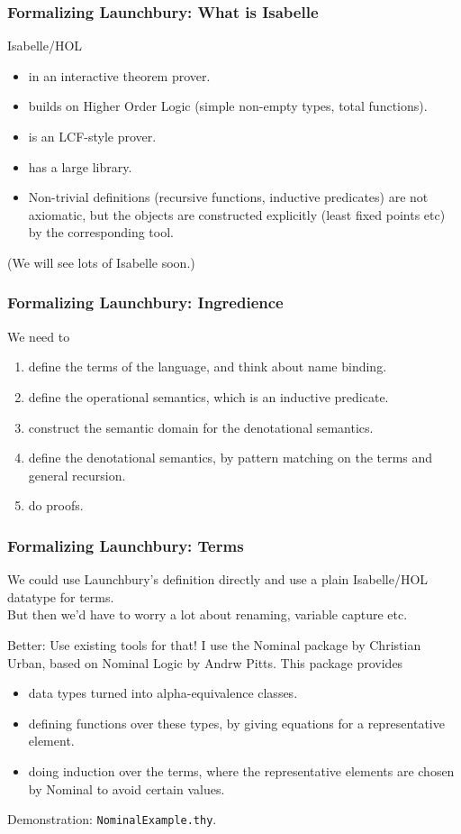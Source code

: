 \documentclass{beamer}
\begin{document}
\begin{frame}
\frametitle{Formalizing Launchbury: What is Isabelle}

Isabelle/HOL
\begin{itemize}
\item in an interactive theorem prover.
\item builds on Higher Order Logic (simple non-empty types, total functions).
\item is an LCF-style prover.
\item has a large library.
\item Non-trivial definitions (recursive functions, inductive predicates) are not axiomatic, but the objects are constructed explicitly (least fixed points etc) by the corresponding tool.
\end{itemize}

(We will see lots of Isabelle soon.)

\end{frame}

\begin{frame}
\frametitle{Formalizing Launchbury: Ingredience}
We need to
\begin{enumerate}
\item define the terms of the language, and think about name binding.
\item define the operational semantics, which is an inductive predicate.
\item construct the semantic domain for the denotational semantics.
\item define the denotational semantics, by pattern matching on the terms and general recursion.
\item do proofs.
\end{enumerate}

\end{frame}

\begin{frame}
\frametitle{Formalizing Launchbury: Terms}

We could use Launchbury's definition directly and use a plain Isabelle/HOL datatype for terms.\\
But then we’d have to worry a lot about renaming, variable capture etc.

\pause
\bigskip

Better: Use existing tools for that! I use the Nominal package by Christian Urban, based on Nominal Logic by Andrw Pitts. This package provides 

\begin{itemize}
\item data types turned into alpha-equivalence classes.
\item defining functions over these types, by giving equations for a representative element.
\item doing induction over the terms, where the representative elements are chosen by Nominal to avoid certain values.
\end{itemize}

\begin{center}
Demonstration: \texttt{NominalExample.thy}.
\end{center}
\end{frame}
\end{document}
